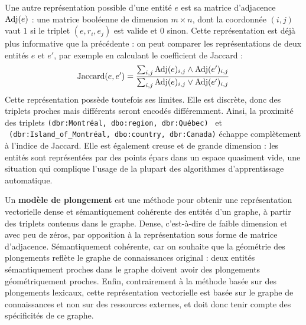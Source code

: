 Une autre représentation possible d'une entité $e$ est sa matrice d'adjacence $\operatorname{Adj}(e)$ \cite{hoser2006semantic}: une matrice booléenne de dimension $m \times n$, dont la coordonnée $(i, j)$ vaut $1$ si le triplet $(e, r_i, e_j)$ est valide et $0$ sinon. Cette représentation est déjà plus informative que la précédente : on peut comparer les représentations de deux entités $e$ et $e'$, par exemple en calculant le coefficient de Jaccard :
\begin{equation}
    \operatorname{Jaccard}(e, e') = \frac{\sum_{i, j} \operatorname{Adj}(e)_{i, j} \land \operatorname{Adj}(e')_{i, j}}{\sum_{i, j} \operatorname{Adj}(e)_{i, j} \lor \operatorname{Adj}(e')_{i, j}}    
\end{equation}
Cette représentation possède toutefois ses limites. Elle est discrète, donc des triplets proches mais différents seront encodés différemment. Ainsi, la proximité des triplets \texttt{(dbr:Montréal, dbo:region,  dbr:Québec)} \ et \ \texttt{(dbr:Island\_of\_Montréal,  dbo:country, dbr:Canada)} échappe complètement à l'indice de Jaccard. Elle est également creuse et de grande dimension : les entités sont représentées par des points épars dans un espace quasiment vide, une situation qui complique l'usage de la plupart des algorithmes d'apprentissage automatique.






Un \textbf{modèle de plongement} est une méthode pour obtenir une représentation vectorielle dense et sémantiquement cohérente des entités d'un graphe, à partir des triplets contenus dans le graphe. Dense, c'est-à-dire de faible dimension et avec peu de zéros, par opposition à la représentation sous forme de matrice d'adjacence. Sémantiquement cohérente, car on souhaite que la géométrie des plongements reflète le graphe de connaissances original : deux entités sémantiquement proches dans le graphe doivent avoir des plongements géométriquement proches. Enfin, contrairement à la méthode basée sur des plongements lexicaux, cette représentation vectorielle est basée sur le graphe de connaissances et non sur des ressources externes, et doit donc tenir compte des spécificités de ce graphe.

